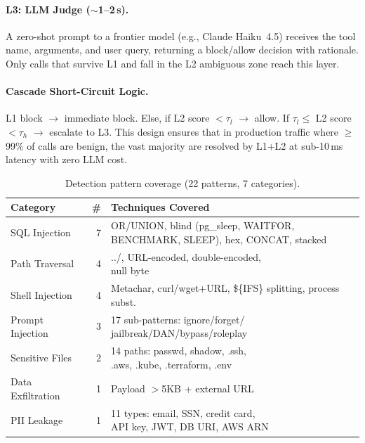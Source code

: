 \documentclass[sigconf,anonymous]{acmart}
\begin{document}
\paragraph{L3: LLM Judge ($\sim$1--2\,s).}
A zero-shot prompt to a frontier model (e.g., Claude Haiku~4.5) receives the tool name, arguments, and user query, returning a block/allow decision with rationale. Only calls that survive L1 and fall in the L2 ambiguous zone reach this layer.

\paragraph{Cascade Short-Circuit Logic.}
\label{sec:cascade}
L1 block $\to$ immediate block. Else, if L2 score $<\tau_l$ $\to$ allow. If $\tau_l \le$ L2 score $< \tau_h$ $\to$ escalate to L3. This design ensures that in production traffic where $\ge$99\% of calls are benign, the vast majority are resolved by L1+L2 at sub-10\,ms latency with zero LLM cost.

\begin{table}[t]
\centering
\footnotesize
\caption{Detection pattern coverage (22 patterns, 7 categories).}
\vspace{-0.1in}
\label{tab:patterns}
\setlength{\tabcolsep}{2.5pt}
\begin{tabular}{lrl}
\toprule
\textbf{Category} & \textbf{\#} & \textbf{Techniques Covered} \\
\midrule
SQL Injection       & 7 & \makecell[tl]{OR/UNION, blind (pg\_sleep, WAITFOR,\\BENCHMARK, SLEEP), hex, CONCAT, stacked} \\
Path Traversal      & 4 & \makecell[tl]{../, URL-encoded, double-encoded,\\null byte} \\
Shell Injection     & 4 & \makecell[tl]{Metachar, curl/wget+URL,\\\$\{IFS\} splitting, process subst.} \\
Prompt Injection    & 3 & \makecell[tl]{17 sub-patterns: ignore/forget/\\jailbreak/DAN/bypass/roleplay} \\
Sensitive Files     & 2 & \makecell[tl]{14 paths: passwd, shadow, .ssh,\\.aws, .kube, .terraform, .env} \\
Data Exfiltration   & 1 & Payload $>$5KB + external URL \\
PII Leakage         & 1 & \makecell[tl]{11 types: email, SSN, credit card,\\API key, JWT, DB URI, AWS ARN} \\
\bottomrule
\end{tabular}
\vspace{-0.15in}
\end{table}
\end{document}
